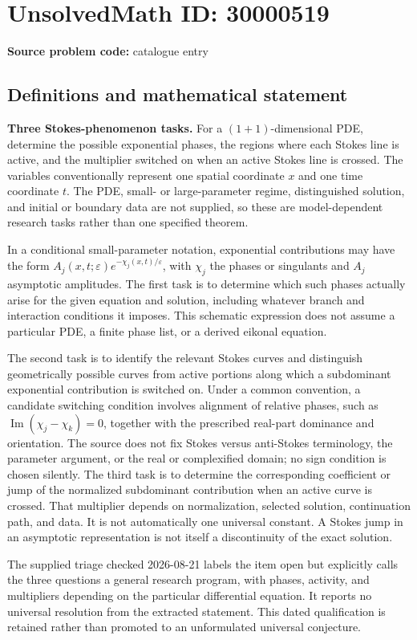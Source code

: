 \documentclass[11pt]{article}
\begin{document}
\section*{UnsolvedMath ID: 30000519}
\textbf{Source problem code:} catalogue entry
\subsection{Definitions and mathematical statement}
\textbf{Three Stokes-phenomenon tasks.} For a \((1+1)\)-dimensional PDE, determine the possible exponential phases, the regions where each Stokes line is active, and the multiplier switched on when an active Stokes line is crossed. The variables conventionally represent one spatial coordinate \(x\) and one time coordinate \(t\). The PDE, small- or large-parameter regime, distinguished solution, and initial or boundary data are not supplied, so these are model-dependent research tasks rather than one specified theorem.\par In a conditional small-parameter notation, exponential contributions may have the form \(A_j(x,t;\varepsilon)e^{-\chi_j(x,t)/\varepsilon}\), with \(\chi_j\) the phases or singulants and \(A_j\) asymptotic amplitudes. The first task is to determine which such phases actually arise for the given equation and solution, including whatever branch and interaction conditions it imposes. This schematic expression does not assume a particular PDE, a finite phase list, or a derived eikonal equation.\par The second task is to identify the relevant Stokes curves and distinguish geometrically possible curves from active portions along which a subdominant exponential contribution is switched on. Under a common convention, a candidate switching condition involves alignment of relative phases, such as \(\operatorname{Im}(\chi_j-\chi_k)=0\), together with the prescribed real-part dominance and orientation. The source does not fix Stokes versus anti-Stokes terminology, the parameter argument, or the real or complexified domain; no sign condition is chosen silently. The third task is to determine the corresponding coefficient or jump of the normalized subdominant contribution when an active curve is crossed. That multiplier depends on normalization, selected solution, continuation path, and data. It is not automatically one universal constant. A Stokes jump in an asymptotic representation is not itself a discontinuity of the exact solution.\par The supplied triage checked 2026-08-21 labels the item open but explicitly calls the three questions a general research program, with phases, activity, and multipliers depending on the particular differential equation. It reports no universal resolution from the extracted statement. This dated qualification is retained rather than promoted to an unformulated universal conjecture.
\end{document}
